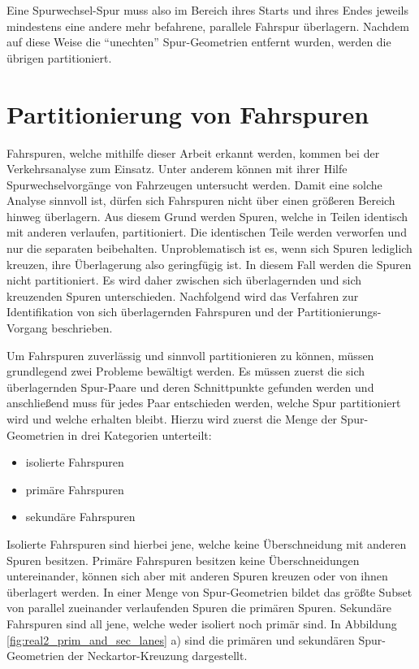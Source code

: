 Eine Spurwechsel-Spur muss also im Bereich ihres Starts und ihres Endes jeweils mindestens eine andere
mehr befahrene, parallele Fahrspur überlagern.
Nachdem auf diese Weise die ``unechten'' Spur-Geometrien entfernt wurden, werden die übrigen partitioniert.

\section{Partitionierung von Fahrspuren}
\label{sec:real2_lane_partitioning}

Fahrspuren, welche mithilfe dieser Arbeit erkannt werden, kommen bei der Verkehrsanalyse zum Einsatz.
Unter anderem können mit ihrer Hilfe Spurwechselvorgänge von Fahrzeugen untersucht werden. Damit eine
solche Analyse sinnvoll ist, dürfen sich Fahrspuren nicht über einen größeren Bereich hinweg überlagern.
Aus diesem Grund werden Spuren, welche in Teilen identisch mit anderen verlaufen, partitioniert. Die
identischen Teile werden verworfen und nur die separaten beibehalten.
Unproblematisch ist es, wenn sich Spuren lediglich kreuzen, ihre Überlagerung also geringfügig ist.
In diesem Fall werden die Spuren nicht partitioniert. Es wird daher zwischen sich überlagernden und sich
kreuzenden Spuren unterschieden. Nachfolgend wird das Verfahren
zur Identifikation von sich überlagernden Fahrspuren und der Partitionierungs-Vorgang beschrieben.

Um Fahrspuren zuverlässig und sinnvoll partitionieren zu können, müssen grundlegend zwei Probleme bewältigt
werden. Es müssen zuerst die sich überlagernden Spur-Paare und deren Schnittpunkte gefunden werden und
anschließend muss für jedes Paar entschieden werden, welche Spur partitioniert wird und welche erhalten bleibt.
Hierzu wird zuerst die Menge der Spur-Geometrien in drei Kategorien unterteilt:

\begin{itemize}
    \item isolierte Fahrspuren
    \item primäre Fahrspuren
    \item sekundäre Fahrspuren
\end{itemize}

Isolierte Fahrspuren sind hierbei jene, welche keine Überschneidung mit anderen Spuren besitzen. Primäre
Fahrspuren besitzen keine Überschneidungen untereinander, können sich aber mit anderen Spuren kreuzen oder
von ihnen überlagert werden. In einer Menge von Spur-Geometrien bildet das größte Subset von parallel
zueinander verlaufenden Spuren die primären Spuren. Sekundäre Fahrspuren sind all jene, welche
weder isoliert noch primär sind. In Abbildung \ref{fig:real2_prim_and_sec_lanes} a) sind die primären und
sekundären Spur-Geometrien der Neckartor-Kreuzung dargestellt.


